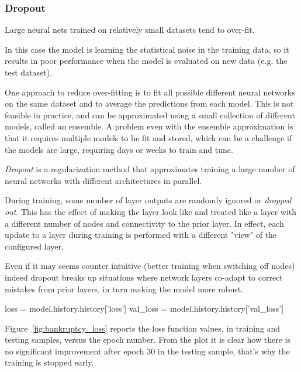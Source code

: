 \begin{attention}
\subsubsection{Dropout}

Large neural nets trained on relatively small datasets tend to over-fit.

In this case the model is learning the statistical noise in the training data, so it results in poor performance when the model is evaluated on new data (e.g. the test dataset).

One approach to reduce over-fitting is to fit all possible different neural networks on the same dataset and to average the predictions from each model. This is not feasible in practice, and can be approximated using a small collection of different models, called an ensemble. A problem even with the ensemble approximation is that it requires multiple models to be fit and stored, which can be a challenge if the models are large, requiring days or weeks to train and tune.

\emph{Dropout} is a regularization method that approximates training a large number of neural networks with different architectures in parallel.

During training, some number of layer outputs are randomly ignored or \emph{dropped out}. This has the effect of making the layer look like and treated like a layer with a different number of nodes and connectivity to the prior layer. In effect, each update to a layer during training is performed with a different "view" of the configured layer.

Even if it may seems counter intuitive (better training when switching off nodes) indeed dropout breaks up situations where network layers co-adapt to correct mistakes from prior layers, in turn making the model more robust.
\end{attention}

\begin{ipythonnon}
loss = model.history.history['loss']
val_loss = model.history.history['val_loss']
\end{ipythonnon}

Figure~\ref{fig:bankruptcy_loss} reports the loss function values, in training and testing samples, versus the epoch number. From the plot it is clear how there is no significant improvement after epoch 30 in the testing sample, that's why the training is stopped early.

